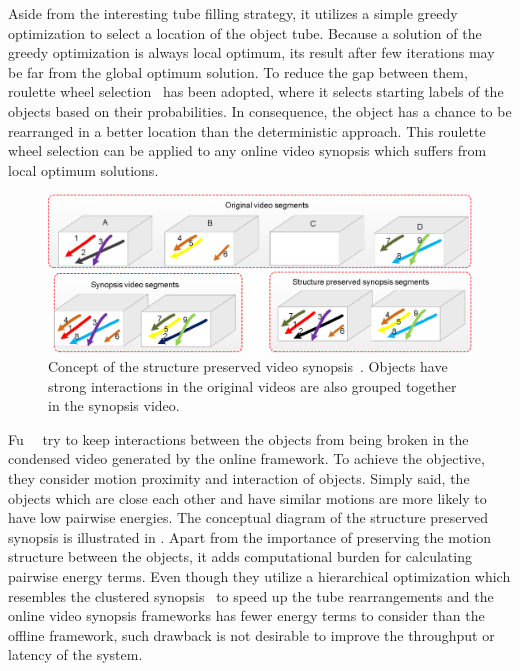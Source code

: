 \documentclass[11pt]{hyu_thesis}
\begin{document}
Aside from the interesting tube filling strategy, it utilizes a simple greedy optimization to select a location of the object tube. Because a solution of the greedy optimization is always local optimum, its result after few iterations may be far from the global optimum solution. To reduce the gap between them, roulette wheel selection~\cite{Mitchell1998} has been adopted, where it selects starting labels of the objects based on their probabilities. In consequence, the object has a chance to be rearranged in a better location than the deterministic approach. This roulette wheel selection can be applied to any online video synopsis which suffers from local optimum solutions.

\begin{figure}
	\centering
	\includegraphics[width=\linewidth]{ext-fu.eps}
	\caption{Concept of the structure preserved video synopsis~\cite{Fu2014}. Objects have strong interactions in the original videos are also grouped together in the synopsis video.}
	\label{fig:Fu}
\end{figure}

Fu~\etal~\cite{Fu2014} try to keep interactions between the objects from being broken in the condensed video generated by the online framework. To achieve the objective, they consider motion proximity and interaction of objects. Simply said, the objects which are close each other and have similar motions are more likely to have low pairwise energies. The conceptual diagram of the structure preserved synopsis is illustrated in . Apart from the importance of preserving the motion structure between the objects, it adds computational burden for calculating pairwise energy terms. Even though they utilize a hierarchical optimization which resembles the clustered synopsis~\cite{Pritch2009} to speed up the tube rearrangements and the online video synopsis frameworks has fewer energy terms to consider than the offline framework, such drawback is not desirable to improve the throughput or latency of the system.
\end{document}
